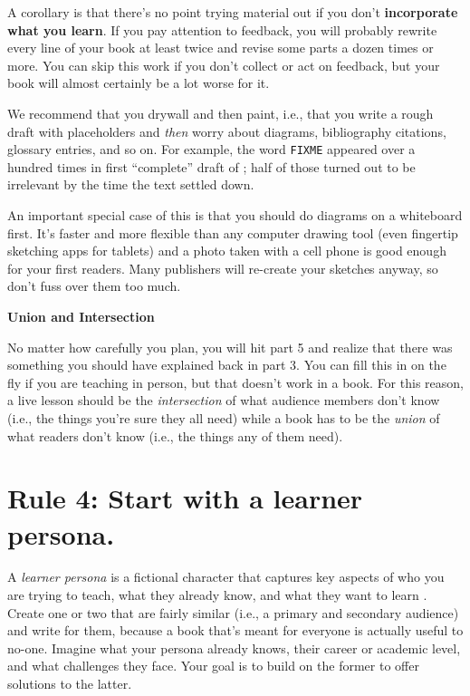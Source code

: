 \documentclass[10pt,letterpaper]{article}
\begin{document}
A corollary is that there's no point trying material out if you don't
\textbf{incorporate what you learn}. If you pay attention to feedback,
you will probably rewrite every line of your book at least twice and
revise some parts a dozen times or more. You can skip this work if you
don't collect or act on feedback, but your book will almost certainly be
a lot worse for it.

We recommend that you drywall and then paint, i.e., that you write a
rough draft with placeholders and \emph{then} worry about diagrams,
bibliography citations, glossary entries, and so on. For example, the
word \texttt{FIXME} appeared over a hundred times in first ``complete''
draft of \cite{Wi2019}; half of those turned out to be irrelevant by the
time the text settled down.

An important special case of this is that you should do diagrams on a
whiteboard first. It's faster and more flexible than any computer
drawing tool (even fingertip sketching apps for tablets) and a photo
taken with a cell phone is good enough for your first readers. Many
publishers will re-create your sketches anyway, so don't fuss over them
too much.

\begin{mdframed}
\textbf{Union and Intersection}

\noindent
No matter how carefully you plan, you will hit part 5 and realize that
there was something you should have explained back in part 3. You can
fill this in on the fly if you are teaching in person, but that doesn't
work in a book. For this reason, a live lesson should be the
\emph{intersection} of what audience members don't know (i.e., the
things you're sure they all need) while a book has to be the
\emph{union} of what readers don't know (i.e., the things any of them
need).
\end{mdframed}

\section*{Rule 4: Start with a learner persona.}

A \emph{learner persona} is a fictional character that captures key
aspects of who you are trying to teach, what they already know, and what
they want to learn \cite{Wi2019}. Create one or two that are fairly
similar (i.e., a primary and secondary audience) and write for them,
because a book that's meant for everyone is actually useful to no-one.
Imagine what your persona already knows, their career or academic level,
and what challenges they face. Your goal is to build on the former to
offer solutions to the latter.
\end{document}
